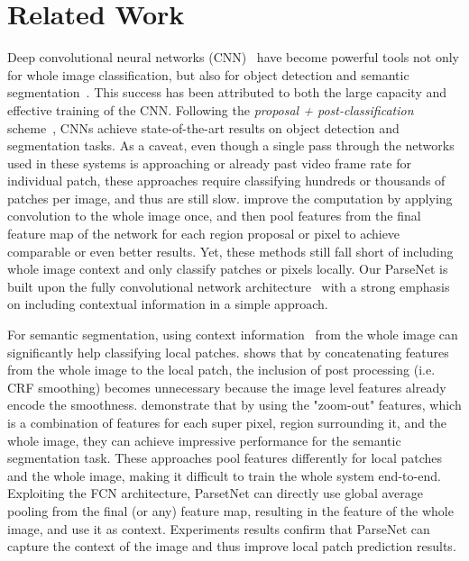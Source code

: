 \documentclass{article} \usepackage{iclr2016_conference}
\begin{document}
\section{Related Work}
\label{sec:relatedwork}
Deep convolutional neural networks (CNN)~\cite{krizhevsky2012imagenet, szegedy2014going, simonyan2014very} have become powerful tools not only for whole image classification, but also for object detection and semantic segmentation~\cite{girshick2014rich, szegedy2014scalable, gupta2014learning}. This success has been attributed to both the large capacity and effective training of the CNN. Following the \textit{proposal + post-classification} scheme~\cite{uijlings2013selective}, CNNs achieve state-of-the-art results on object detection and segmentation tasks. As a caveat, even though a single pass through the networks used in these systems is approaching or already past video frame rate for individual patch, these approaches require classifying hundreds or thousands of patches per image, and thus are still slow. \cite{he2014spatial, long2014fully} improve the computation by applying convolution to the whole image once, and then pool features from the final feature map of the network for each region proposal or pixel to achieve comparable or even better results. Yet, these methods still fall short of including whole image context and only classify patches or pixels locally. Our ParseNet is built upon the fully convolutional network architecture~\cite{long2014fully} with a strong emphasis on including contextual information in a simple approach.

For semantic segmentation, using context information~\cite{rabinovich2007objects, shotton2009textonboost, torralba2003contextual} from the whole image can significantly help classifying local patches. \cite{lucchi2011spatial} shows that by concatenating features from the whole image to the local patch, the inclusion of post processing (i.e. CRF smoothing) becomes unnecessary because the image level features already encode the smoothness. \cite{mostajabi2014feedforward} demonstrate that by using the "zoom-out" features, which is a combination of features for each super pixel, region surrounding it, and the whole image, they can achieve impressive performance for the semantic segmentation task. These approaches pool features differently for local patches and the whole image, making it difficult to train the whole system end-to-end. Exploiting the FCN architecture, ParsetNet can directly use global average pooling from the final (or any) feature map, resulting in the feature of the whole image, and use it as context. Experiments results confirm that ParseNet can capture the context of the image and thus improve local patch prediction results.
\end{document}
